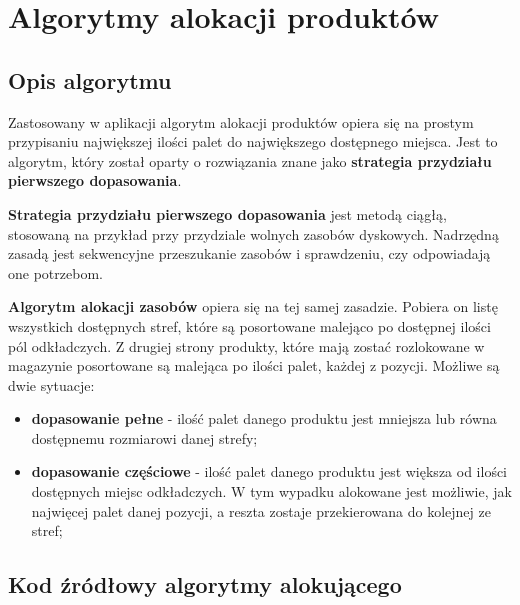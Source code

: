 \chapter{Algorytmy alokacji produktów}
\label{ca:allocationAlgorithms}

	\section{Opis algorytmu}
		Zastosowany w aplikacji algorytm alokacji produktów opiera się na prostym 
		przypisaniu największej ilości palet do największego dostępnego miejsca. 
		Jest to algorytm, który został oparty o rozwiązania znane jako 
		\textbf{strategia przydziału pierwszego dopasowania}.
		
		\textbf{Strategia przydziału pierwszego dopasowania} jest metodą ciągłą,
		stosowaną na przykład przy przydziale wolnych zasobów dyskowych. Nadrzędną zasadą
		jest sekwencyjne przeszukanie zasobów i sprawdzeniu, czy odpowiadają one 
		potrzebom.
		
		\textbf{Algorytm alokacji zasobów} opiera się na tej samej zasadzie. Pobiera
		on listę wszystkich dostępnych stref, które są posortowane malejąco po dostępnej
		ilości pól odkładczych. Z drugiej strony produkty, które mają zostać
		rozlokowane w magazynie posortowane są malejąca po ilości palet, każdej z pozycji.
		Możliwe są dwie sytuacje:
		\begin{itemize}
			\item \textbf{dopasowanie pełne} - ilość palet danego produktu jest mniejsza lub
			równa dostępnemu rozmiarowi danej strefy;
			\item \textbf{dopasowanie częściowe} - ilość palet danego produktu jest większa od ilości
			dostępnych miejsc odkładczych. W tym wypadku alokowane jest możliwie, jak najwięcej palet
			danej pozycji, a reszta zostaje przekierowana do kolejnej ze stref;
		\end{itemize}

	\section{Kod źródłowy algorytmy alokującego}
